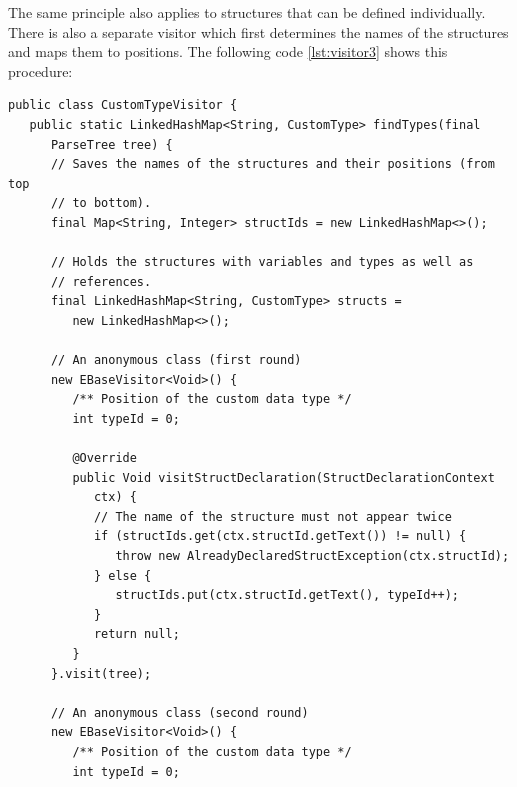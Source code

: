 The same principle also applies to structures that can be defined individually. There is also a separate visitor which first determines the names of the structures and maps them to positions. The following code \ref{lst:visitor3} shows this procedure:

\begin{lstlisting}[frame=htrbl, caption={Implementation of {\ttfamily CustomTypeVisitor.java}}, label={lst:visitor3}, basicstyle=\footnotesize]
public class CustomTypeVisitor {
   public static LinkedHashMap<String, CustomType> findTypes(final 
      ParseTree tree) {
      // Saves the names of the structures and their positions (from top 
      // to bottom).
      final Map<String, Integer> structIds = new LinkedHashMap<>();

      // Holds the structures with variables and types as well as 
      // references.
      final LinkedHashMap<String, CustomType> structs = 
         new LinkedHashMap<>();

      // An anonymous class (first round)
      new EBaseVisitor<Void>() {
         /** Position of the custom data type */
         int typeId = 0;

         @Override
         public Void visitStructDeclaration(StructDeclarationContext 
            ctx) {
            // The name of the structure must not appear twice
            if (structIds.get(ctx.structId.getText()) != null) {
               throw new AlreadyDeclaredStructException(ctx.structId);
            } else {
               structIds.put(ctx.structId.getText(), typeId++);
            }
            return null;
         }
      }.visit(tree);

      // An anonymous class (second round)
      new EBaseVisitor<Void>() {
         /** Position of the custom data type */
         int typeId = 0;


\end{lstlisting}
